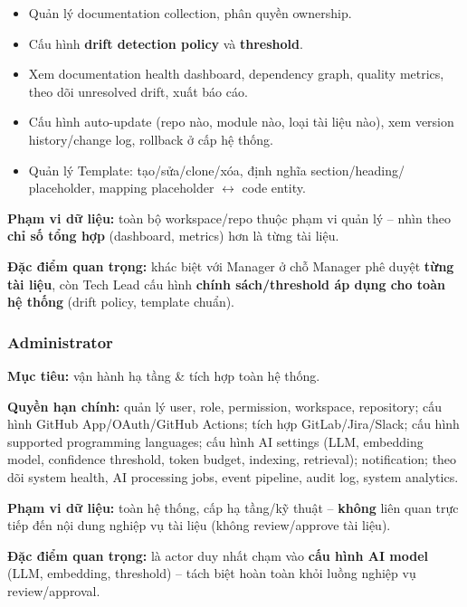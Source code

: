 \begin{itemize}
    \item Quản lý documentation collection, phân quyền ownership.

    \item Cấu hình \textbf{drift detection policy} và \textbf{threshold}.

    \item Xem documentation health dashboard, dependency graph,
    quality metrics, theo dõi unresolved drift, xuất báo cáo.

    \item Cấu hình auto-update (repo nào, module nào, loại tài liệu nào),
    xem version history/change log, rollback ở cấp hệ thống.

    \item Quản lý Template: tạo/sửa/clone/xóa, định nghĩa section/heading/
    placeholder, mapping placeholder $\leftrightarrow$ code entity.
\end{itemize}

\textbf{Phạm vi dữ liệu:} toàn bộ workspace/repo thuộc phạm vi quản lý --
nhìn theo \textbf{chỉ số tổng hợp} (dashboard, metrics) hơn là từng tài liệu.

\textbf{Đặc điểm quan trọng:} khác biệt với Manager ở chỗ Manager phê duyệt
\textbf{từng tài liệu}, còn Tech Lead cấu hình \textbf{chính sách/threshold
áp dụng cho toàn hệ thống} (drift policy, template chuẩn).


\subsubsection{Administrator}

\textbf{Mục tiêu:} vận hành hạ tầng \& tích hợp toàn hệ thống.

\textbf{Quyền hạn chính:} quản lý user, role, permission, workspace,
repository; cấu hình GitHub App/OAuth/GitHub Actions; tích hợp
GitLab/Jira/Slack; cấu hình supported programming languages; cấu hình AI
settings (LLM, embedding model, confidence threshold, token budget,
indexing, retrieval); notification; theo dõi system health, AI processing
jobs, event pipeline, audit log, system analytics.

\textbf{Phạm vi dữ liệu:} toàn hệ thống, cấp hạ tầng/kỹ thuật --
\textbf{không} liên quan trực tiếp đến nội dung nghiệp vụ tài liệu
(không review/approve tài liệu).

\textbf{Đặc điểm quan trọng:} là actor duy nhất chạm vào
\textbf{cấu hình AI model} (LLM, embedding, threshold) -- tách biệt
hoàn toàn khỏi luồng nghiệp vụ review/approval.


